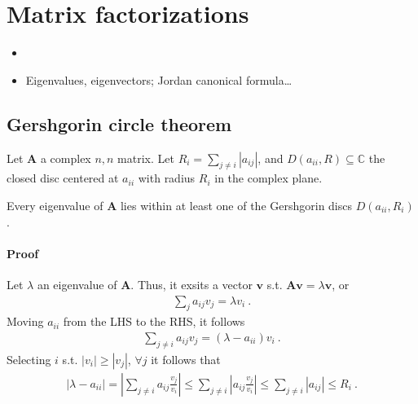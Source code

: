 \documentclass[letterpaper,10pt,english]{jupyterBook}
\begin{document}
\sphinxstepscope


\chapter{Matrix factorizations}
\label{\detokenize{ch/linear-algebra/matrix-factorization:matrix-factorizations}}\label{\detokenize{ch/linear-algebra/matrix-factorization:math-matrix-factorization}}\label{\detokenize{ch/linear-algebra/matrix-factorization::doc}}\begin{itemize}
\item {} 
\sphinxAtStartPar
{}

\item {} 
\sphinxAtStartPar
{} Eigenvalues, eigenvectors; Jordan canonical formula…

\end{itemize}


\section{Gershgorin circle theorem}
\label{\detokenize{ch/linear-algebra/matrix-factorization:gershgorin-circle-theorem}}\label{\detokenize{ch/linear-algebra/matrix-factorization:math-matrix-factorization-ev-gershgorin}}
\sphinxAtStartPar
Let \(\mathbf{A}\) a complex \(n,n\) matrix. Let \(R_i = \sum_{j \ne i} |a_{ij}|\), and \(D(a_{ii}, R) \subseteq \mathbb{C}\) the closed disc centered at \(a_{ii}\) with radius \(R_i\) in the complex plane.

\sphinxAtStartPar
Every eigenvalue of \(\mathbf{A}\) lies within at least one of the Gershgorin discs \(D(a_{ii}, R_i)\).
\subsubsection*{Proof}

\sphinxAtStartPar
Let \(\lambda\) an eigenvalue of \(\mathbf{A}\). Thus, it exsits a vector \(\mathbf{v}\) s.t. \(\mathbf{A} \mathbf{v} = \lambda \mathbf{v}\), or
\begin{equation*}
\begin{split}\sum_{j} a_{ij} v_j = \lambda v_i \ .\end{split}
\end{equation*}
\sphinxAtStartPar
Moving \(a_{ii}\) from the LHS to the RHS, it follows
\begin{equation*}
\begin{split}\sum_{j \ne i} a_{ij} v_j = \left( \lambda - a_{ii} \right) v_i \ .\end{split}
\end{equation*}
\sphinxAtStartPar
Selecting \(i\) s.t. \(|v_i| \ge |v_j|\), \(\forall j\) it follows that
\begin{equation*}
\begin{split}|\lambda - a_{ii}| = \left| \sum_{j \ne i} a_{ij} \frac{v_j}{v_i} \right| \le  \sum_{j \ne i} \left| a_{ij} \frac{v_j}{v_i} \right| \le \sum_{j \ne i} | a_{ij} | \le R_{i} \ .\end{split}
\end{equation*}
\end{document}
